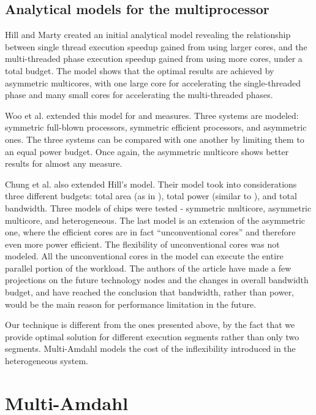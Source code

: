 \documentclass[twocolumn,english]{IEEEtran}
\begin{document}
\subsection*{Analytical models for the multiprocessor}

Hill and Marty \cite{hill2008amdahl} created an initial analytical
model revealing the relationship between single thread execution speedup
gained from using larger cores, and the multi-threaded phase execution
speedup gained from using more cores, under a total budget. The model
shows that the optimal results are achieved by asymmetric multicores,
with one large core for accelerating the single-threaded phase and
many small cores for accelerating the multi-threaded phases. 

Woo et al. \cite{ExtendingAmda} extended this model for 
and  measures. Three systems are modeled: symmetric
full-blown processors, symmetric efficient processors, and asymmetric
ones. The three systems can be compared with one another by limiting
them to an equal power budget. Once again, the asymmetric multicore
shows better results for almost any measure.

Chung et al. \cite{Single-ChipHe} also extended Hill's model. Their
model took into considerations three different budgets: total area
(as in \cite{hill2008amdahl}), total power (similar to \cite{ExtendingAmda}),
and total bandwidth. Three models of chips were tested - symmetric
multicore, asymmetric multicore, and heterogeneous. The last model
is an extension of the asymmetric one, where the efficient cores are
in fact {}``unconventional cores'' and therefore even more power
efficient. The flexibility of unconventional cores was not modeled.
All the unconventional cores in the model can execute the entire parallel
portion of the workload. The authors of the article have made a few
projections on the future technology nodes and the changes in overall
bandwidth budget, and have reached the conclusion that bandwidth,
rather than power, would be the main reason for performance limitation
in the future.

Our technique is different from the ones presented above, by the fact
that we provide optimal solution for  different execution segments
rather than only two segments. Multi-Amdahl models the cost of the
inflexibility introduced in the heterogeneous system.




\section{Multi-Amdahl}
\end{document}
